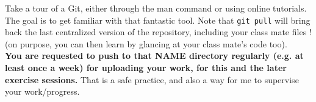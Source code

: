 \documentclass[a4paper,12pt]{article}
\begin{document}
Take a tour of a Git, either through the man command or using online tutorials. 
The goal is to get familiar with that fantastic tool. Note that {\tt git pull} 
will bring back the last centralized version of the repository, including your 
class mate files ! (on purpose, you can then learn by glancing at your class 
mate's code too).\\
{\bf You are requested to push to that NAME directory regularly (e.g. at least 
once a week) for uploading your work, for this and the later exercise sessions.} 
That is a safe practice, and also a way for me to supervise your work/progress.
\end{document}
